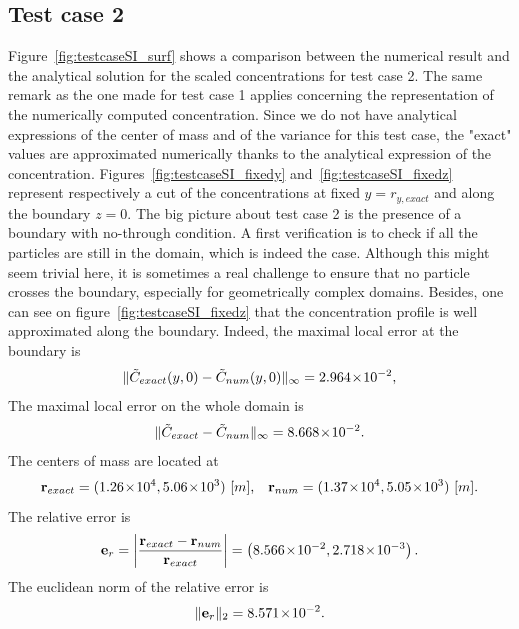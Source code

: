 \subsection{Test case 2}
Figure~\ref{fig:testcaseSI_surf} shows a comparison between the numerical result and the analytical solution for the scaled concentrations for test case 2. The same remark as the one made for test case 1 applies concerning the representation of the numerically computed concentration. Since we do not have analytical expressions of the center of mass and of the variance for this test case, the "exact" values are approximated numerically thanks to the analytical expression of the concentration. Figures~\ref{fig:testcaseSI_fixedy} and~\ref{fig:testcaseSI_fixedz} represent respectively a cut of the concentrations at fixed $y = r_{y,exact}$ and along the boundary $z = 0$. The big picture about test case 2 is the presence of a boundary with no-through condition. A first verification is to check if all the particles are still in the domain, which is indeed the case. Although this might seem trivial here, it is sometimes a real challenge to ensure that no particle crosses the boundary, especially for geometrically complex domains. Besides, one can see on figure~\ref{fig:testcaseSI_fixedz} that the concentration profile is well approximated along the boundary. Indeed, the maximal local error at the boundary is
\begin{equation}
	\|\tilde C_{exact}(y,0)- \tilde C_{num}(y,0)\|_{\infty} = 2.964\!\times\!10^{-2}, 
\end{equation}
The maximal local error on the whole domain is 
\begin{equation}
	\|\tilde C_{exact}- \tilde C_{num}\|_{\infty} = 8.668\!\times\!10^{-2}.
\end{equation}
The centers of mass are located at
\begin{equation}
	\b r_{exact} = (1.26\e{4},5.06\e{3}) \mbox{ [$m$],}\quad \b r_{num} = (1.37\e{4},5.05\e{3}) \mbox{ [$m$]}.
\end{equation}
The relative error is
\begin{equation}
	\mathbf e_r = \left \lvert \frac{\mathbf r_{exact}-\mathbf r_{num}}{\mathbf r_{exact}} \right \rvert =  \left(8.566\!\times\!10^{-2}, 2.718\!\times\!10^{-3}\right).
\end{equation}
The euclidean norm of the relative error is
\begin{equation}
	\| \mathbf e_r \|_2 = 8.571\!\times\!10^{-2}.
\end{equation}
